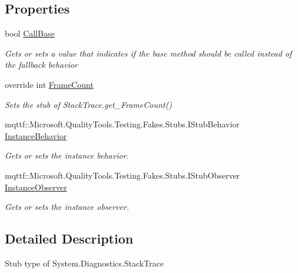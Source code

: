\subsection*{Properties}
\begin{DoxyCompactItemize}
\item 
bool \hyperlink{class_system_1_1_diagnostics_1_1_fakes_1_1_stub_stack_trace_a204531c161f0acd80b86afa9019bcce6}{Call\-Base}
\begin{DoxyCompactList}\small\item\em Gets or sets a value that indicates if the base method should be called instead of the fallback behavior\end{DoxyCompactList}\item 
override int \hyperlink{class_system_1_1_diagnostics_1_1_fakes_1_1_stub_stack_trace_ac049d805f26abe6294fc4d3a980acbbd}{Frame\-Count}
\begin{DoxyCompactList}\small\item\em Sets the stub of Stack\-Trace.\-get\-\_\-\-Frame\-Count()\end{DoxyCompactList}\item 
mqttf\-::\-Microsoft.\-Quality\-Tools.\-Testing.\-Fakes.\-Stubs.\-I\-Stub\-Behavior \hyperlink{class_system_1_1_diagnostics_1_1_fakes_1_1_stub_stack_trace_a21e423b37c0fb010b56dbdcece2ff623}{Instance\-Behavior}
\begin{DoxyCompactList}\small\item\em Gets or sets the instance behavior.\end{DoxyCompactList}\item 
mqttf\-::\-Microsoft.\-Quality\-Tools.\-Testing.\-Fakes.\-Stubs.\-I\-Stub\-Observer \hyperlink{class_system_1_1_diagnostics_1_1_fakes_1_1_stub_stack_trace_a07b22f54072a6bb7b54e4dd6215e0023}{Instance\-Observer}
\begin{DoxyCompactList}\small\item\em Gets or sets the instance observer.\end{DoxyCompactList}\end{DoxyCompactItemize}


\subsection{Detailed Description}
Stub type of System.\-Diagnostics.\-Stack\-Trace



